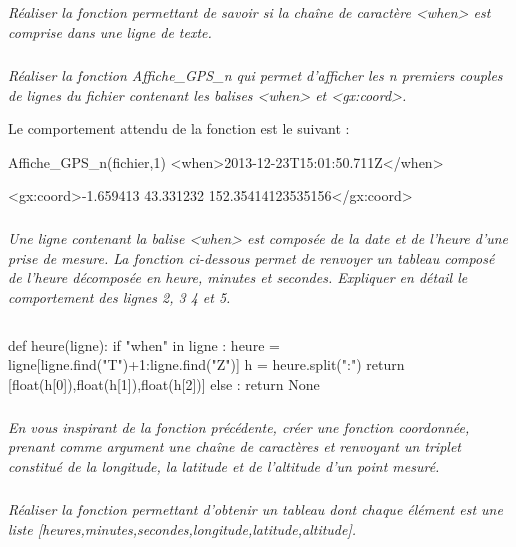 \documentclass[10pt,oneside]{article}
\begin{document}
\subparagraph{}
\textit{Réaliser la fonction permettant de savoir si la chaîne de caractère \textsf{<when>} est comprise dans une ligne de texte.}


\subparagraph{}
\textit{Réaliser la fonction \textsf{Affiche\_GPS\_n} qui permet d'afficher les n premiers couples de lignes du fichier contenant les balises \textsf{<when>} et \textsf{<gx:coord>}.}
\begin{exemple}
Le comportement attendu de la fonction est le suivant :
\begin{py}
\begin{python}
Affiche_GPS_n(fichier,1)
    <when>2013-12-23T15:01:50.711Z</when>
    
    <gx:coord>-1.659413 43.331232 152.35414123535156</gx:coord>
    
\end{python}
\end{py}
\end{exemple}


\subparagraph{}
\textit{Une ligne contenant la balise \textsf{<when>} est composée de la date et de l'heure d'une prise de mesure. La fonction ci-dessous permet de renvoyer un tableau composé de l'heure décomposée en heure, minutes et secondes. Expliquer en détail le comportement des lignes 2, 3 4 et 5.}

\begin{py}
\begin{minipage}[c]{.1\linewidth}
$$ $$
\end{minipage}\hfill
\begin{minipage}[c]{.8\linewidth}
\begin{python_nb}
def heure(ligne):
    if "when" in ligne :
        heure = ligne[ligne.find("T")+1:ligne.find("Z")]
        h = heure.split(":")
        return [float(h[0]),float(h[1]),float(h[2])]
    else :
        return None
\end{python_nb}
\end{minipage}
\end{py}


\subparagraph{}
\textit{En vous inspirant de la fonction précédente, créer une fonction \textsf{coordonnée}, prenant comme argument une chaîne de caractères et renvoyant un triplet constitué de la longitude, la latitude et de l'altitude d'un point mesuré.}


\subparagraph{}
\textit{Réaliser la fonction permettant d'obtenir un tableau dont chaque élément est une liste \textsf{[heures,minutes,secondes,longitude,latitude,altitude]}.}
\end{document}
